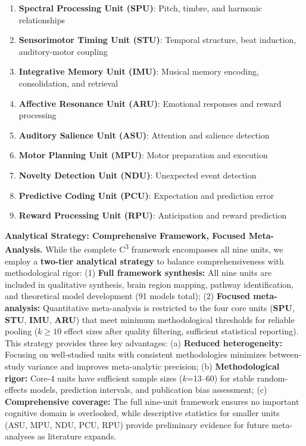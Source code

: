 \documentclass[9pt,onecolumn]{article}
\newcommand{\STU}{\textcolor{stucolor}{\textbf{STU}}}
\newcommand{\IMU}{\textcolor{imucolor}{\textbf{IMU}}}
\newcommand{\SPU}{\textcolor{spucolor}{\textbf{SPU}}}
\newcommand{\ARU}{\textcolor{arucolor}{\textbf{ARU}}}
\newcommand{\ASU}{\textcolor{asucolor}{\textbf{ASU}}}
\newcommand{\MPU}{\textcolor{mpucolor}{\textbf{MPU}}}
\newcommand{\NDU}{\textcolor{nducolor}{\textbf{NDU}}}
\newcommand{\PCU}{\textcolor{pcucolor}{\textbf{PCU}}}
\newcommand{\RPU}{\textcolor{rpucolor}{\textbf{RPU}}}
\newcommand{\Cthree}{C\textsuperscript{3}}
\begin{document}
\begin{enumerate}[leftmargin=*, topsep=0pt, itemsep=0pt]
    \item \textbf{Spectral Processing Unit (\SPU{})}: Pitch, timbre, and harmonic relationships
    \item \textbf{Sensorimotor Timing Unit (\STU{})}: Temporal structure, beat induction, auditory-motor coupling
    \item \textbf{Integrative Memory Unit (\IMU{})}: Musical memory encoding, consolidation, and retrieval
    \item \textbf{Affective Resonance Unit (\ARU{})}: Emotional responses and reward processing
    \item \textbf{Auditory Salience Unit (\ASU{})}: Attention and salience detection
    \item \textbf{Motor Planning Unit (\MPU{})}: Motor preparation and execution
    \item \textbf{Novelty Detection Unit (\NDU{})}: Unexpected event detection
    \item \textbf{Predictive Coding Unit (\PCU{})}: Expectation and prediction error
    \item \textbf{Reward Processing Unit (\RPU{})}: Anticipation and reward prediction
\end{enumerate}

\textbf{Analytical Strategy: Comprehensive Framework, Focused Meta-Analysis.} While the complete \Cthree{} framework encompasses all nine units, we employ a \textbf{two-tier analytical strategy} to balance comprehensiveness with methodological rigor: (1) \textbf{Full framework synthesis:} All nine units are included in qualitative synthesis, brain region mapping, pathway identification, and theoretical model development (91 models total); (2) \textbf{Focused meta-analysis:} Quantitative meta-analysis is restricted to the four core units (\SPU{}, \STU{}, \IMU{}, \ARU{}) that meet minimum methodological thresholds for reliable pooling ($k \geq 10$ effect sizes after quality filtering, sufficient statistical reporting). This strategy provides three key advantages: (a) \textbf{Reduced heterogeneity:} Focusing on well-studied units with consistent methodologies minimizes between-study variance and improves meta-analytic precision; (b) \textbf{Methodological rigor:} Core-4 units have sufficient sample sizes ($k$=13--60) for stable random-effects models, prediction intervals, and publication bias assessment; (c) \textbf{Comprehensive coverage:} The full nine-unit framework ensures no important cognitive domain is overlooked, while descriptive statistics for smaller units (ASU, MPU, NDU, PCU, RPU) provide preliminary evidence for future meta-analyses as literature expands.
\end{document}
